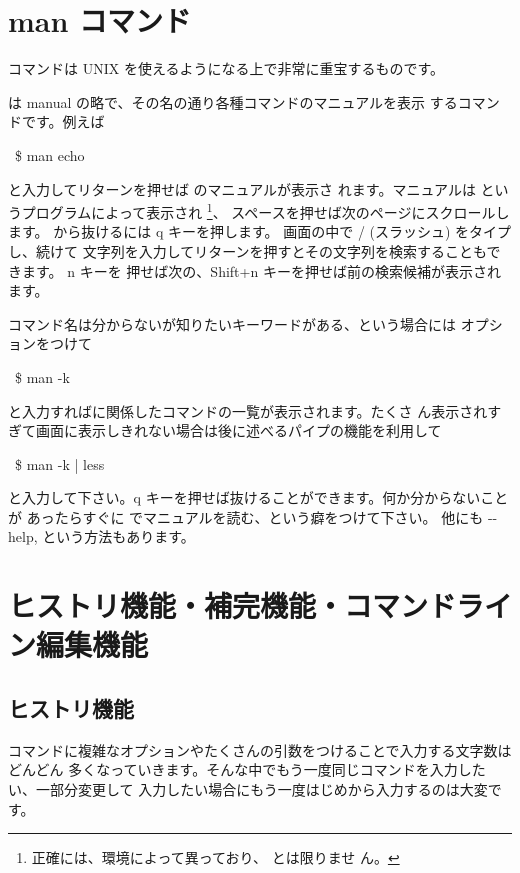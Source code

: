 \documentclass[platex]{jsarticle}
\begin{document}
\section{man コマンド}

  コマンドは UNIX を使えるようになる上で非常に重宝するものです。

  は manual の略で、その名の通り各種コマンドのマニュアルを表示
 するコマンドです。例えば
 \begin{terminal}~\$ man echo\end{terminal}
 と入力してリターンを押せば  のマニュアルが表示さ
 れます。マニュアルは  というプログラムによって表示され
 \footnote{ 正確には、環境によって異っており、 とは限りませ
 ん。}、
 スペースを押せば次のページにスクロールします。  から抜けるには
 q キーを押します。 画面の中で / (スラッシュ) をタイプし、続けて
 文字列を入力してリターンを押すとその文字列を検索することもできます。 n キーを
 押せば次の、Shift+n キーを押せば前の検索候補が表示されます。

 コマンド名は分からないが知りたいキーワードがある、という場合には
  オプションをつけて
 \begin{terminal}~\$ man -k \end{terminal}
 と入力すればに関係したコマンドの一覧が表示されます。たくさ
 ん表示されすぎて画面に表示しきれない場合は後に述べるパイプの機能を利用して
 \begin{terminal}~\$ man -k  | less\end{terminal}
 と入力して下さい。q キーを押せば抜けることができます。何か分からないことが
 あったらすぐに  でマニュアルを読む、という癖をつけて下さい。
 他にも -{-help},  という方法もあります。



%

\section{ヒストリ機能・補完機能・コマンドライン編集機能}

 \subsection{ヒストリ機能}
 コマンドに複雑なオプションやたくさんの引数をつけることで入力する文字数はどんどん
 多くなっていきます。そんな中でもう一度同じコマンドを入力したい、一部分変更して
 入力したい場合にもう一度はじめから入力するのは大変です。
\end{document}
